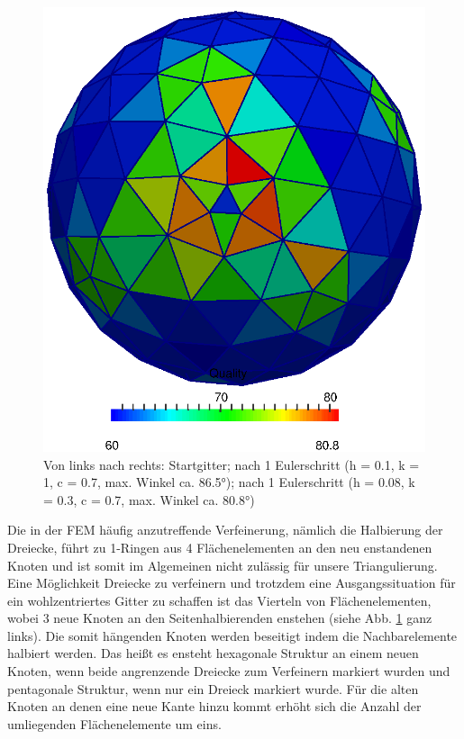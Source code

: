 \begin{figure}
\begin{minipage}[t]{0.32\textwidth}
        \end{minipage}
        \begin{minipage}[t]{0.32\textwidth}
        \includegraphics[width=\textwidth]{bilder/meshCorrector/sphereDivBy4AfterH008K03C07_1Step.eps}
        \end{minipage}
        \hfill
        \caption[Gittergenerierung: Lokale Verfeinerung]
                 {Von links nach rechts: 
                 Startgitter; 
                 nach 1 Eulerschritt (h = 0.1, k = 1, c = 0.7, max. Winkel ca. \ang{86.5});
                 nach 1 Eulerschritt (h = 0.08, k = 0.3, c = 0.7, max. Winkel ca. \ang{80.8})}
         \label{AbbVerfeinerung}
      \end{figure}

      Die in der FEM häufig anzutreffende Verfeinerung, nämlich die Halbierung der Dreiecke, führt zu 1-Ringen aus 4 Flächenelementen an den neu
      enstandenen Knoten und ist somit im Algemeinen nicht zulässig für unsere Triangulierung.
      Eine Möglichkeit Dreiecke zu verfeinern und trotzdem eine Ausgangssituation für ein wohlzentriertes Gitter zu schaffen ist das Vierteln von
      Flächenelementen, wobei 3 neue Knoten an den Seitenhalbierenden enstehen (siehe Abb. \ref{AbbVerfeinerung} ganz links). 
      Die somit hängenden Knoten werden beseitigt indem die Nachbarelemente halbiert werden.
      Das heißt es ensteht hexagonale Struktur an einem neuen Knoten, wenn beide angrenzende Dreiecke zum Verfeinern markiert wurden und
      pentagonale Struktur, wenn nur ein Dreieck markiert wurde. Für die alten Knoten an denen eine neue Kante hinzu kommt erhöht sich die Anzahl
      der umliegenden Flächenelemente um eins.

